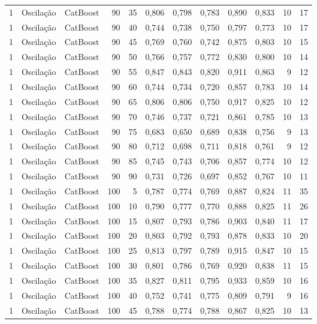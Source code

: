 \begin{longtable}{@{}rllrrrrrrrrr@{}}
1 & Oscilação & CatBoost & 90 & 35 & 0,806 & 0,798 & 0,783 & 0,890 & 0,833 & 10 & 17 \\
1 & Oscilação & CatBoost & 90 & 40 & 0,744 & 0,738 & 0,750 & 0,797 & 0,773 & 10 & 17 \\
1 & Oscilação & CatBoost & 90 & 45 & 0,769 & 0,760 & 0,742 & 0,875 & 0,803 & 10 & 15 \\
1 & Oscilação & CatBoost & 90 & 50 & 0,766 & 0,757 & 0,772 & 0,830 & 0,800 & 10 & 14 \\
1 & Oscilação & CatBoost & 90 & 55 & 0,847 & 0,843 & 0,820 & 0,911 & 0,863 & 9 & 12 \\
1 & Oscilação & CatBoost & 90 & 60 & 0,744 & 0,734 & 0,720 & 0,857 & 0,783 & 10 & 14 \\
1 & Oscilação & CatBoost & 90 & 65 & 0,806 & 0,806 & 0,750 & 0,917 & 0,825 & 10 & 12 \\
1 & Oscilação & CatBoost & 90 & 70 & 0,746 & 0,737 & 0,721 & 0,861 & 0,785 & 10 & 13 \\
1 & Oscilação & CatBoost & 90 & 75 & 0,683 & 0,650 & 0,689 & 0,838 & 0,756 & 9 & 13 \\
1 & Oscilação & CatBoost & 90 & 80 & 0,712 & 0,698 & 0,711 & 0,818 & 0,761 & 9 & 12 \\
1 & Oscilação & CatBoost & 90 & 85 & 0,745 & 0,743 & 0,706 & 0,857 & 0,774 & 10 & 12 \\
1 & Oscilação & CatBoost & 90 & 90 & 0,731 & 0,726 & 0,697 & 0,852 & 0,767 & 10 & 11 \\
1 & Oscilação & CatBoost & 100 & 5 & 0,787 & 0,774 & 0,769 & 0,887 & 0,824 & 11 & 35 \\
1 & Oscilação & CatBoost & 100 & 10 & 0,790 & 0,777 & 0,770 & 0,888 & 0,825 & 11 & 26 \\
1 & Oscilação & CatBoost & 100 & 15 & 0,807 & 0,793 & 0,786 & 0,903 & 0,840 & 11 & 17 \\
1 & Oscilação & CatBoost & 100 & 20 & 0,803 & 0,792 & 0,793 & 0,878 & 0,833 & 10 & 20 \\
1 & Oscilação & CatBoost & 100 & 25 & 0,813 & 0,797 & 0,789 & 0,915 & 0,847 & 10 & 15 \\
1 & Oscilação & CatBoost & 100 & 30 & 0,801 & 0,786 & 0,769 & 0,920 & 0,838 & 11 & 15 \\
1 & Oscilação & CatBoost & 100 & 35 & 0,827 & 0,811 & 0,795 & 0,933 & 0,859 & 10 & 16 \\
1 & Oscilação & CatBoost & 100 & 40 & 0,752 & 0,741 & 0,775 & 0,809 & 0,791 & 9 & 16 \\
1 & Oscilação & CatBoost & 100 & 45 & 0,788 & 0,774 & 0,788 & 0,867 & 0,825 & 10 & 13 \\

\end{longtable}
